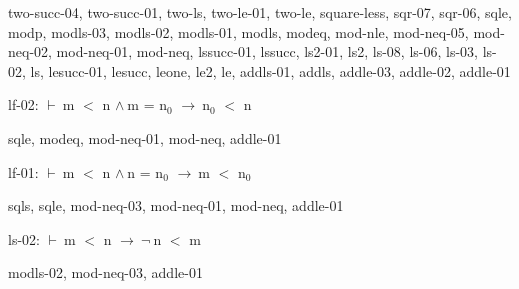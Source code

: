 \documentclass[a4paper]{article}
\newcommand{\Fol}{\mbox{$\vdash\ $}}
\newcommand{\Not}{\mbox{$\neg\ $}}
\newcommand{\And}{\mbox{$\wedge\ $}}
\newcommand{\Imp}{\mbox{$\rightarrow\ $}}
\begin{document}
two-succ-04, two-succ-01, two-ls, two-le-01, two-le, square-less, sqr-07, sqr-06, sqle, modp, modls-03, modls-02, modls-01, modls, modeq, mod-nle, mod-neq-05, mod-neq-02, mod-neq-01, mod-neq, lssucc-01, lssucc, ls2-01, ls2, ls-08, ls-06, ls-03, ls-02, ls, lesucc-01, lesucc, leone, le2, le, addls-01, addls, addle-03, addle-02, addle-01

\bigskip

lf-02: 
 \Fol m $<$ n \And m = $\mbox{n}_{0}$ \Imp $\mbox{n}_{0}$ $<$ n



sqle, modeq, mod-neq-01, mod-neq, addle-01

\bigskip

lf-01: 
 \Fol m $<$ n \And n = $\mbox{n}_{0}$ \Imp m $<$ $\mbox{n}_{0}$



sqls, sqle, mod-neq-03, mod-neq-01, mod-neq, addle-01

\bigskip

ls-02: 
 \Fol m $<$ n \Imp \Not n $<$ m



modls-02, mod-neq-03, addle-01

\bigskip
\end{document}
